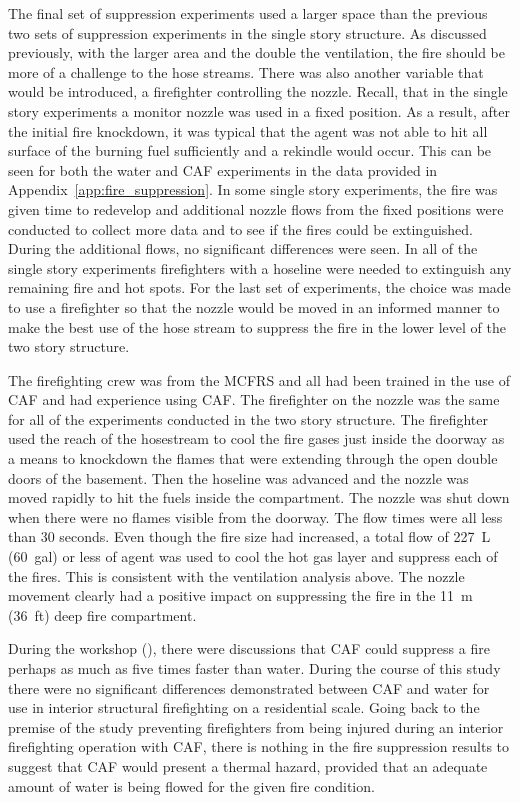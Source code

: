 \documentclass[12pt,oneside]{book}
\begin{document}
The final set of suppression experiments used a larger space than the previous two sets of suppression experiments in the single story structure. As discussed previously, with the larger area and the double the ventilation, the fire should be more of a challenge to the hose streams. There was also another variable that would be introduced, a firefighter controlling the nozzle. Recall, that in the single story experiments a monitor nozzle was used in a fixed position. As a result, after the initial fire knockdown, it was typical that the agent was not able to hit all surface of the burning fuel sufficiently and a rekindle would occur. This can be seen for both the water and CAF experiments in the data provided in Appendix~\ref{app:fire_suppression}. In some single story experiments, the fire was given time to redevelop and additional nozzle flows from the fixed positions were conducted to collect more data and to see if the fires could be extinguished. During the additional flows, no significant differences were seen. In all of the single story experiments firefighters with a hoseline were needed to extinguish any remaining fire and hot spots. For the last set of experiments, the choice was made to use a firefighter so that the nozzle would be moved in an informed manner to make the best use of the hose stream to suppress the fire in the lower level of the two story structure.  

The firefighting crew was from the MCFRS and all had been trained in the use of CAF and had experience using CAF. The firefighter on the nozzle was the same for all of the experiments conducted in the two story structure. The firefighter used the reach of the hosestream to cool the fire gases just inside the doorway as a means to knockdown the flames that were extending through the open double doors of the basement. Then the hoseline was advanced and the nozzle was moved rapidly to hit the fuels inside the compartment. The nozzle was shut down when there were no flames visible from the doorway. The flow times were all less than 30 seconds. Even though the fire size had increased, a total flow of 227~L (60~gal) or less of agent was used to cool the hot gas layer and suppress each of the fires. This is consistent with the ventilation analysis above. The nozzle movement clearly had a positive impact on suppressing the fire in the 11~m (36~ft) deep fire compartment.    

During the workshop (\cite{Grant:2011}), there were discussions that CAF could suppress a fire perhaps as much as five times faster than water. During the course of this study there were no significant differences demonstrated between CAF and water for use in interior structural firefighting on a residential scale. Going back to the premise of the study preventing firefighters from being injured during an interior firefighting operation with CAF, there is nothing in the fire suppression results to suggest that CAF would present a thermal hazard, provided that an adequate amount of water is being flowed for the given fire condition. 
\end{document}
